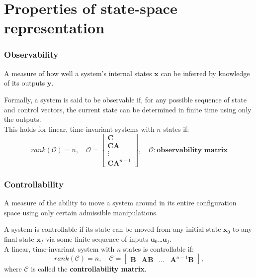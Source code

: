 \section{Properties of state-space representation}

\begin{frame}
\frametitle{Observability}
\begin{definition}
A measure of how well a system's internal states $\mathbf{x}$ can be inferred by knowledge of its outputs $\mathbf{y}$. 
\end{definition}
Formally, a system is said to be observable if, for any possible sequence of state and control vectors, the current state can be determined in finite time using only the outputs. \\
This holds for linear, time-invariant systems with $n$ states if:
\begin{equation*}
rank(\mathcal{O}) = n,\quad \mathcal{O} = \begin{bmatrix} \mathbf{C} \\ \mathbf{CA} \\ \vdots \\ \mathbf{CA}^{n-1} \end{bmatrix}, \quad \mathcal{O}: \textbf{observability matrix}
\end{equation*}

\end{frame}

\begin{frame}
\frametitle{Controllability}
\begin{definition}
A measure of the ability to move a system around in its entire configuration space using only certain admissible manipulations.
\end{definition}
A system is controllable if its state can be moved from any initial state $\mathbf{x}_0$ to any final state $\mathbf{x}_f$ via some finite sequence of inputs $\mathbf{u}_0$\ldots$\mathbf{u}_f$. \\
A linear, time-invariant system with $n$ states is controllable if:
\begin{equation*}
rank(\mathcal{C}) = n,\quad \mathcal{C} = \begin{bmatrix} \mathbf{B} & \mathbf{AB} & \ldots & \mathbf{A}^{n-1}\mathbf{B} \end{bmatrix},
\end{equation*}
where $\mathcal{C}$ is called the \textbf{controllability matrix}.

\end{frame}

